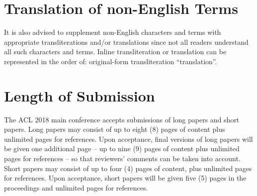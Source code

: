 \documentclass[11pt,a4paper]{article}
\begin{document}



\section{Translation of non-English Terms}

It is also advised to supplement non-English characters and terms
with appropriate transliterations and/or translations
since not all readers understand all such characters and terms.
Inline transliteration or translation can be represented in
the order of: original-form transliteration ``translation''.

\section{Length of Submission}
\label{sec:length}

The ACL 2018 main conference accepts submissions of long papers and
short papers.
 Long papers may consist of up to eight (8) pages of
content plus unlimited pages for references. Upon acceptance, final
versions of long papers will be given one additional page -- up to nine (9)
pages of content plus unlimited pages for references -- so that reviewers' comments
can be taken into account. Short papers may consist of up to four (4)
pages of content, plus unlimited pages for references. Upon
acceptance, short papers will be given five (5) pages in the
proceedings and unlimited pages for references.
\end{document}

